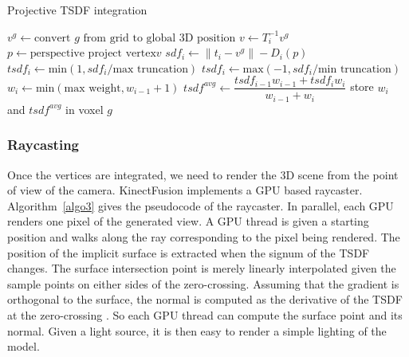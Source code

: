 \documentclass[12pt, twoside]{article}
\begin{document}
\begin{algorithm}
\caption{Projective TSDF integration}\label{algo2}
\begin{algorithmic}[1]
  \State $v^g \gets \text{convert }g\text{ from grid to global 3D position}$
  \State $v \gets T_i^{-1}v^g$
  \State $p \gets \text{perspective project vertex} v$
    \State $sdf_i \gets \left\|t_i-v^{g}\right\| - D_i(p)$
      \State $tsdf_i \gets \text{min}(1, sdf_i/\text{max truncation})$
      \Else
      \State $tsdf_i \gets \text{max}(-1, sdf_i/\text{min truncation})$
      \EndIf
    \State $w_i \gets \text{min}(\text{max weight}, w_{i-1}+1)$
    \State $tsdf^{avg} \gets \dfrac{tsdf_{i-1}w_{i-1}+tsdf_iw_i}{w_{i-1}+w_i}$
    \State store $w_i$ and $tsdf^{avg}$ in voxel $g$
    \EndIf
  \EndWhile
\EndFor
\end{algorithmic}
\end{algorithm}

\subsubsection{Raycasting}
Once the vertices are integrated, we need to render the 3D scene from the point of view of the camera. KinectFusion implements a GPU based raycaster. Algorithm~\ref{algo3} gives the pseudocode of the raycaster. In parallel, each GPU renders one pixel of the generated view. A GPU thread is given a starting position and walks along the ray corresponding to the pixel being rendered. The position of the implicit surface is extracted when the signum of the TSDF changes. The surface intersection point is merely linearly interpolated given the sample points on either sides of the zero-crossing. Assuming that the gradient is orthogonal to the surface, the normal is computed as the derivative of the TSDF at the zero-crossing \cite{SDF}. So each GPU thread can compute the surface point and its normal. Given a light source, it is then easy to render a simple lighting of the model.
\end{document}
